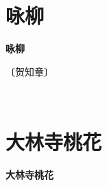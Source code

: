 \documentclass[12pt,UTF-8,openany,fontset=none]{ctexbook}
\begin{document}
\vspace{8pt}
\clearpage


\section{咏柳}



\begin{center}
    {\bfseries 咏柳}
\end{center}

\begin{center}
    \vspace{10pt}
    
    \begin{large}
        
        〔贺知章〕
        
    \end{large}
    
    \vspace{8pt}
    
    \begin{huge}
        
        \phantom{。}~~

        \phantom{。}
        
        \phantom{...} \!\! {}

        \phantom{。}
        
    \end{huge}
    
\end{center}

\vspace{8pt}
\clearpage


\section{大林寺桃花}



\begin{center}
    {\bfseries 大林寺桃花}
\end{center}
\end{document}
